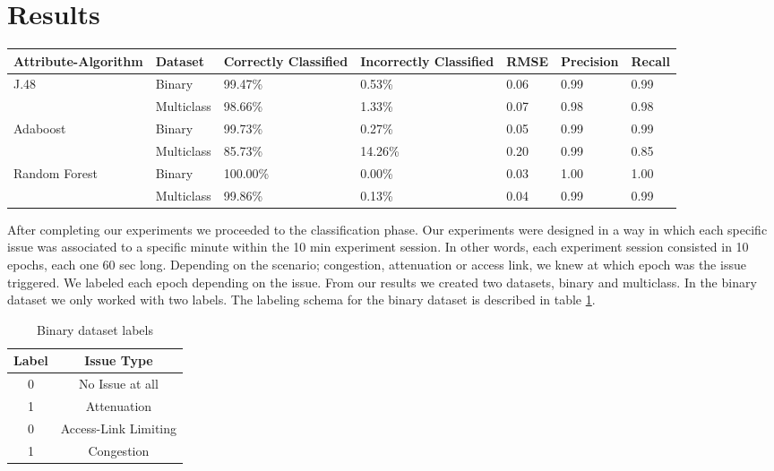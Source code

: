 \section{Results}\label{Results}

\begin{table}[bp]
	\begin{center}
		\begin{tabular}{|| m{2.5cm} | m{2cm} | m{2cm}| m{2cm} | m{2cm}| m{2cm} | m{2cm}  ||}
			\hline
			Attribute-Algorithm & Dataset & Correctly Classified & Incorrectly Classified & RMSE & Precision & Recall \\ [0.5ex] 
			\hline\hline
			\multirow{2}{*}{J.48} & Binary & 99.47\% & 0.53\% & 0.06 & 0.99 & 0.99 \\
			& Multiclass & 98.66\% & 1.33\% & 0.07 & 0.98 & 0.98 \\
			\multirow{2}{*}{Adaboost} & Binary & 99.73\% & 0.27\% & 0.05 & 0.99 & 0.99 \\
			& Multiclass & 85.73\% & 14.26\% & 0.20 & 0.99 & 0.85 \\
			\multirow{2}{*}{Random Forest} & Binary & 100.00\% & 0.00\% & 0.03 & 1.00 & 1.00 \\
			& Multiclass & 99.86\% & 0.13\% & 0.04 & 0.99 & 0.99 \\
			\hline
		\end{tabular}
	\end{center}
\end{table}

After completing our experiments we proceeded to the classification phase. Our experiments were designed in a way in which each specific issue was associated to a specific minute within the 10 min experiment session. In other words, each experiment session consisted in 10 epochs, each one 60 sec long. Depending on the scenario; congestion, attenuation or access link, we knew at which epoch was the issue triggered. We labeled each epoch depending on the issue. From our results we created two datasets, binary and multiclass. In the binary dataset we only worked with two labels. The labeling schema for the binary dataset is described in table \ref{table:binary_labels}.

\begin{table}[!h]
	\begin{center}
		\begin{tabular}{||c c||} 
			\hline
			Label & Issue Type\\ [0.5ex] 
			\hline\hline
			0 & No Issue at all \\ 
			\hline
			1 & Attenuation\\
			\hline
			0 & Access-Link Limiting \\
			\hline
			1 & Congestion \\[1ex] 
			\hline
		\end{tabular}
		\caption{Binary dataset labels}
		\label{table:binary_labels}
	\end{center}
\end{table}


